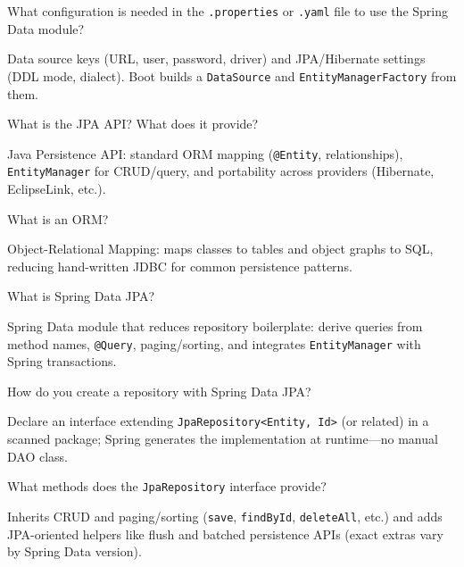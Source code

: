 \newpage


\question[4]
What configuration is needed in the \texttt{.properties} or \texttt{.yaml} file to use the Spring Data module?
\makeemptybox{1.35in}
\begin{solution}
  Data source keys (URL, user, password, driver) and JPA/Hibernate settings (DDL mode, dialect). Boot builds a \texttt{DataSource} and \texttt{EntityManagerFactory} from them.
\end{solution}

\question[4]
What is the JPA API? What does it provide?
\makeemptybox{1.3in}
\begin{solution}
  Java Persistence API: standard ORM mapping (\texttt{@Entity}, relationships), \texttt{EntityManager} for CRUD/query, and portability across providers (Hibernate, EclipseLink, etc.).
\end{solution}

\question[4]
What is an ORM?
\makeemptybox{1.05in}
\begin{solution}
  Object-Relational Mapping: maps classes to tables and object graphs to SQL, reducing hand-written JDBC for common persistence patterns.
\end{solution}

\question[4]
What is Spring Data JPA?
\makeemptybox{1.2in}
\begin{solution}
  Spring Data module that reduces repository boilerplate: derive queries from method names, \texttt{@Query}, paging/sorting, and integrates \texttt{EntityManager} with Spring transactions.
\end{solution}

\question[4]
How do you create a repository with Spring Data JPA?
\makeemptybox{1.2in}
\begin{solution}
  Declare an interface extending \texttt{JpaRepository<Entity, Id>} (or related) in a scanned package; Spring generates the implementation at runtime---no manual DAO class.
\end{solution}

\question[4]
What methods does the \texttt{JpaRepository} interface provide?
\makeemptybox{1.35in}
\begin{solution}
  Inherits CRUD and paging/sorting (\texttt{save}, \texttt{findById}, \texttt{deleteAll}, etc.) and adds JPA-oriented helpers like flush and batched persistence APIs (exact extras vary by Spring Data version).
\end{solution}

